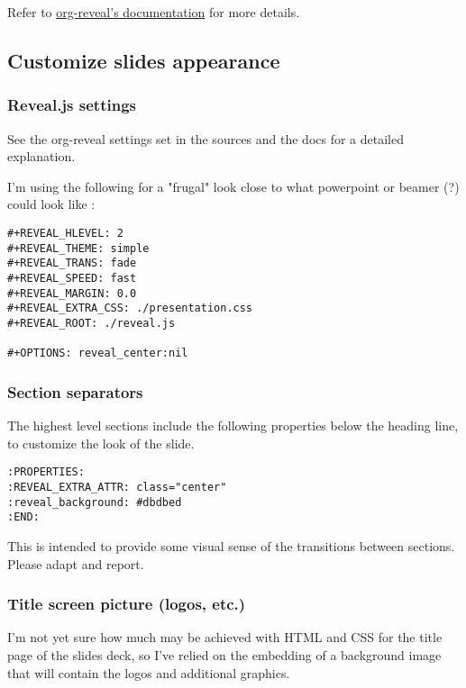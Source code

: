 \documentclass[a4paper]{article}
\newenvironment{NOTES}{\begin{lrbox}{\mybox}\begin{minipage}{0.9\textwidth}\begin{shaded}}{\end{shaded}\end{minipage}\end{lrbox}\fbox{\usebox{\mybox}}}
\begin{document}
\begin{NOTES}
Refer to \href{https://github.com/yjwen/org-reveal/\#requirements-and-installation}{org-reveal's documentation} for more details.
\end{NOTES}

\subsection{Customize slides appearance}
\label{sec:org02d74e4}

\subsubsection{Reveal.js settings}
\label{sec:orge1e1dae}

See the org-reveal settings set in the sources and the docs for a detailed explanation.

I'm using the following for a "frugal" look close to what
powerpoint or beamer (?) could look like :

\begin{verbatim}
#+REVEAL_HLEVEL: 2
#+REVEAL_THEME: simple
#+REVEAL_TRANS: fade
#+REVEAL_SPEED: fast
#+REVEAL_MARGIN: 0.0
#+REVEAL_EXTRA_CSS: ./presentation.css
#+REVEAL_ROOT: ./reveal.js

#+OPTIONS: reveal_center:nil 
\end{verbatim}

\subsubsection{Section separators}
\label{sec:org836384e}

The highest level sections include the following properties below the heading line, to customize the look of the slide. 

\begin{verbatim}
:PROPERTIES:
:REVEAL_EXTRA_ATTR: class="center"
:reveal_background: #dbdbed
:END:
\end{verbatim}

This is intended to provide some visual sense of the transitions between sections. Please adapt and report.

\subsubsection{Title screen picture (logos, etc.)}
\label{sec:orgbb8cdff}

I'm not yet sure how much may be achieved with HTML and CSS for the
title page of the slides deck, so I've relied on the embedding of a
background image that will contain the logos and additional graphics. 
\end{document}
